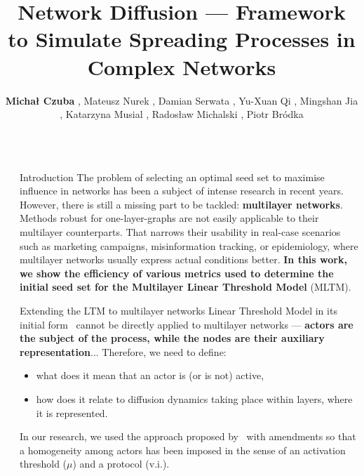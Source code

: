 \documentclass[final]{beamer}
\title{Network Diffusion --- Framework to Simulate Spreading Processes in Complex Networks}
\author{
    \textbf{Micha{\l} Czuba} \inst{1},
    Mateusz Nurek \inst{1},
    Damian Serwata \inst{1},
    Yu-Xuan Qi \inst{2},
    Mingshan Jia \inst{2},
    Katarzyna Musial \inst{2},
    Rados{\l}aw Michalski \inst{1},
    Piotr Br{\'o}dka \inst{1}
}
\institute[]{
  \inst{1} Wroc{\l}aw University of Science and Technology\\
  \inst{2} University of Technology Sydney
}
\newlength{\sepwidth}
\newlength{\colwidth}
\newcommand{\separatorcolumn}{\begin{column}{\sepwidth}\end{column}}
\begin{document}
\begin{frame}[t]
\begin{columns}[t]

\separatorcolumn
\begin{column}{\colwidth}

\begin{block}{Introduction}
    The problem of selecting an optimal seed set to maximise influence in networks has been a subject of intense research in recent years. However, there is still a missing part to be tackled: \textbf{multilayer networks}. Methods robust for one-layer-graphs are not easily applicable to their multilayer counterparts. That narrows their usability in real-case scenarios such as marketing campaigns, misinformation tracking, or epidemiology, where multilayer networks usually express actual conditions better. \textbf{In this work, we show the efficiency of various metrics used to determine the initial seed set for the Multilayer Linear Threshold Model} (MLTM).
\end{block}

\begin{alertblock}{Extending the LTM to multilayer networks}
    Linear Threshold Model in its initial form~\cite{kempe2003maximizing} cannot be directly applied to multilayer networks --- \textbf{actors are the subject of the process, while the nodes are their auxiliary representation}...
    Therefore, we need to define:
    \begin{itemize}
        \item what does it mean that an actor is (or is not) active,
        \item how does it relate to diffusion dynamics taking place within 
        layers, where it is represented.
    \end{itemize}
    In our research, we used the approach proposed by~\cite{zhong2022mltm} with amendments so that a homogeneity among actors has been imposed in the sense of an activation threshold ($\mu$) and a protocol (v.i.).


\end{alertblock}
\end{column}
\end{columns}
\end{frame}
\end{document}
